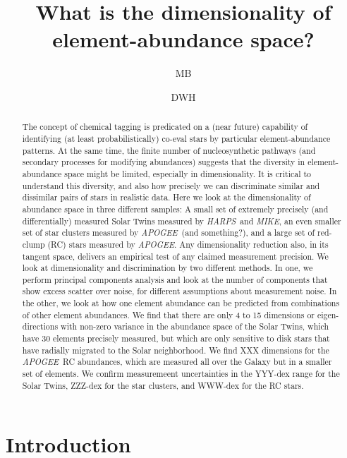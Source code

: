 \documentclass[letterpaper, modern]{aastex62}
\newcommand{\project}[1]{\textsl{#1}}
\newcommand{\acronym}[1]{{\small{#1}}}
\newcommand{\APOGEE}{\project{\acronym{APOGEE}}}
\newcommand{\HARPS}{\project{\acronym{HARPS}}}
\newcommand{\MIKE}{\project{\acronym{MIKE}}}
\begin{document}
\sloppy\sloppypar\raggedbottom\frenchspacing

\title{What is the dimensionality of element-abundance space?}
\author{MB}
\author{DWH}

\begin{abstract}
The concept of chemical tagging is predicated on a (near future) capability
of identifying (at least probabilistically) co-eval stars by particular
element-abundance patterns.
At the same time, the finite number of nucleosynthetic pathways (and secondary
processes for modifying abundances) suggests that the diversity in
element-abundance space might be limited, especially in dimensionality.
It is critical to understand this diversity, and also how precisely
we can discriminate similar and dissimilar pairs of stars in realistic data.
Here we look at the dimensionality of abundance space in three different
samples: A small set of extremely precisely (and differentially) measured
Solar Twins measured by \HARPS\ and \MIKE,
an even smaller set of star clusters measured by \APOGEE\ (and something?),
and a large set of red-clump (RC) stars measured by \APOGEE.
Any dimensionality reduction also, in its tangent space, delivers an empirical
test of any claimed measurement precision.
We look at dimensionality and discrimination by two different methods.
In one, we perform principal components analysis and look at the number of
components that show excess scatter over noise, for different assumptions about
measurement noise.
In the other, we look at how one element abundance can be predicted from combinations
of other element abundances.
We find that there are only 4 to 15 dimensions or eigen-directions with
non-zero variance in the abundance space of the Solar Twins,
which have 30 elements precisely measured, but which are only sensitive to disk
stars that have radially migrated to the Solar neighborhood.
We find XXX dimensions for the \APOGEE\ RC abundances, which are measured
all over the Galaxy but in a smaller set of elements.
We confirm measuremeent uncertainties in the YYY-dex range for the Solar Twins,
ZZZ-dex for the star clusters, and WWW-dex for the RC stars.
\end{abstract}

\section{Introduction}
\end{document}
